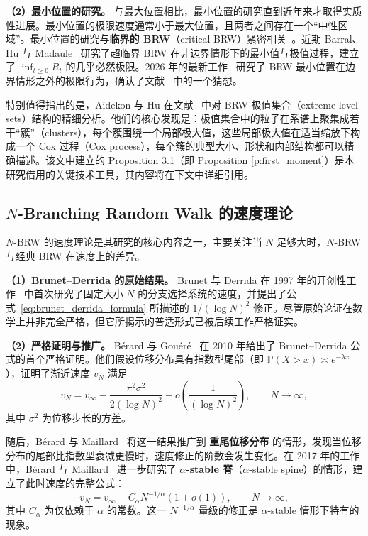 \medskip
\noindent
\textbf{（2）最小位置的研究。}
与最大位置相比，最小位置的研究直到近年来才取得实质性进展。最小位置的极限速度通常小于最大位置，且两者之间存在一个``中性区域''。最小位置的研究与\textbf{临界的 BRW}（critical BRW）紧密相关~\cite{legall2006,shi2015}。近期 Barral、Hu 与 Madaule~\cite{barral2018} 研究了超临界 BRW 在非边界情形下的最小值与极值过程，建立了 $\inf_{t\geqslant 0} R_t$ 的几乎必然极限。2026 年的最新工作~\cite{bramson2026extremal} 研究了 BRW 最小位置在边界情形之外的极限行为，确认了文献~\cite{barral2018} 中的一个猜想。

特别值得指出的是，Aidekon 与 Hu 在文献~\cite{aidekon_hu_2025} 中对 BRW 极值集合（extreme level sets）结构的精细分析。他们的核心发现是：极值集合中的粒子在系谱上聚集成若干``簇''（clusters），每个簇围绕一个局部极大值，这些局部极大值在适当缩放下构成一个 Cox 过程（Cox process），每个簇的典型大小、形状和内部结构都可以精确描述。该文中建立的 Proposition 3.1（即 Proposition \ref{p:first_moment}）是本研究借用的关键技术工具，其内容将在下文中详细引用。

\subsection{$N$-Branching Random Walk 的速度理论}
\label{ssec:nbrw_speed}

$N$-BRW 的速度理论是其研究的核心内容之一，主要关注当 $N$ 足够大时，$N$-BRW 与经典 BRW 在速度上的差异。

\medskip
\noindent
\textbf{（1）Brunet--Derrida 的原始结果。}
Brunet 与 Derrida 在 1997 年的开创性工作~\cite{brunet1997} 中首次研究了固定大小 $N$ 的分支选择系统的速度，并提出了公式~\eqref{eq:brunet_derrida_formula} 所描述的 $1/(\log N)^2$ 修正。尽管原始论证在数学上并非完全严格，但它所揭示的普适形式已被后续工作严格证实。

\medskip
\noindent
\textbf{（2）严格证明与推广。}
Bérard 与 Gouéré~\cite{berard2010} 在 2010 年给出了 Brunet--Derrida 公式的首个严格证明。他们假设位移分布具有指数型尾部（即 $\mathbb{P}(X > x) \asymp e^{-\lambda x}$），证明了渐近速度 $v_N$ 满足
\[
v_N = v_\infty - \frac{\pi^2 \sigma^2}{2(\log N)^2} + o\!\left(\frac{1}{(\log N)^2}\right),
\qquad N\to\infty,
\]
其中 $\sigma^2$ 为位移步长的方差。

随后，Bérard 与 Maillard~\cite{berard2014} 将这一结果推广到 \textbf{重尾位移分布} 的情形，发现当位移分布的尾部比指数型衰减更慢时，速度修正的阶数会发生变化。在 2017 年的工作中，Bérard 与 Maillard~\cite{berard2017} 进一步研究了 \textbf{$\alpha$-stable 脊}（$\alpha$-stable spine）的情形，建立了此时速度的完整公式：
\[
v_N = v_\infty - C_\alpha N^{-1/\alpha} (1+o(1)),
\qquad N\to\infty,
\]
其中 $C_\alpha$ 为仅依赖于 $\alpha$ 的常数。这一 $N^{-1/\alpha}$ 量级的修正是 $\alpha$-stable 情形下特有的现象。

